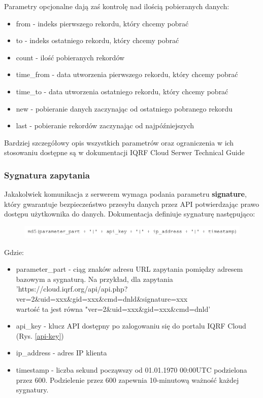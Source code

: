 Parametry opcjonalne dają zaś kontrolę nad ilością pobieranych danych:

\begin{itemize}
    \item from - indeks pierwszego rekordu, który chcemy pobrać
    \item to - indeks ostatniego rekordu, który chcemy pobrać
    \item count - ilość pobieranych rekordów
    \item time\_from - data utworzenia pierwszego rekordu, który chcemy pobrać 
    \item time\_to - data utworzenia ostatniego rekordu, który chcemy pobrać
    \item new - pobieranie danych zaczynając od ostatniego pobranego rekordu
    \item last - pobieranie rekordów zaczynając od najpóźniejszych
\end{itemize}

Bardziej szczegółowy opis wszystkich parametrów oraz ograniczenia w ich stosowaniu dostępne są w dokumentacji IQRF Cloud Serwer Technical Guide 
\cite{iqrfcloud-guide}

\subsubsection{Sygnatura zapytania}

Jakakolwiek komunikacja z serwerem wymaga podania parametru \textbf{signature}, który gwarantuje bezpieczeństwo przesyłu danych przez API 
potwierdzając prawo dostępu użytkownika do danych. Dokumentacja \cite{iqrfcloud-guide} definiuje sygnaturę następująco:

\begin{figure}[H]
    \includegraphics[width=\textwidth]{zdj/md5.png}
\end{figure}

Gdzie: 

\begin{itemize}
    \item parameter\_part - ciąg znaków adresu URL zapytania pomiędzy adresem bazowym a sygnaturą. Na przykład, dla zapytania \\
'https://cloud.iqrf.org/api/api.php?ver=2\&uid=xxx\&gid=xxx\&cmd=dnld\&signature=xxx \\ 
wartość ta jest równa "ver=2\&uid=xxx\&gid=xxx\&cmd=dnld'
    \item api\_key - klucz API dostępny po zalogowaniu się do portalu IQRF Cloud (Rys. \ref{api-key})
    \item ip\_address - adres IP klienta
    \item timestamp - liczba sekund począwszy od 01.01.1970 00:00UTC podzielona przez 600. Podzielenie przez 600 zapewnia 10-minutową
ważność każdej sygnatury.
\end{itemize}

